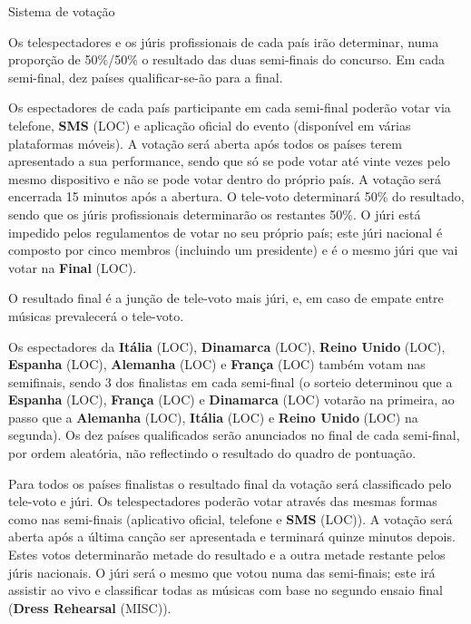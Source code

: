 \documentclass[12pt,a4paper]{article}
\begin{document}
Sistema de votação

Os telespectadores e os júris profissionais de cada país irão determinar, numa proporção de 50\%/50\% o resultado das duas semi-finais do concurso. Em cada semi-final, dez países qualificar-se-ão para a final.

Os espectadores de cada país participante em cada semi-final poderão votar via telefone, \textbf{SMS} (LOC) e aplicação oficial do evento (disponível em várias plataformas móveis). A votação será aberta após todos os países terem apresentado a sua performance, sendo que só se pode votar até vinte vezes pelo mesmo dispositivo e não se pode votar dentro do próprio país. A votação será encerrada 15 minutos após a abertura. O tele-voto determinará 50\% do resultado, sendo que os júris profissionais determinarão os restantes 50\%. O júri está impedido pelos regulamentos de votar no seu próprio país; este júri nacional é composto por cinco membros (incluindo um presidente) e é o mesmo júri que vai votar na \textbf{Final} (LOC).

O resultado final é a junção de tele-voto mais júri, e, em caso de empate entre músicas prevalecerá o tele-voto.

Os espectadores da \textbf{Itália} (LOC), \textbf{Dinamarca} (LOC), \textbf{Reino Unido} (LOC), \textbf{Espanha} (LOC), \textbf{Alemanha} (LOC) e \textbf{França} (LOC) também votam nas semifinais, sendo 3 dos finalistas em cada semi-final (o sorteio determinou que a \textbf{Espanha} (LOC), \textbf{França} (LOC) e \textbf{Dinamarca} (LOC) votarão na primeira, ao passo que a \textbf{Alemanha} (LOC), \textbf{Itália} (LOC) e \textbf{Reino Unido} (LOC) na segunda). Os dez países qualificados serão anunciados no final de cada semi-final, por ordem aleatória, não reflectindo o resultado do quadro de pontuação.

Para todos os países finalistas o resultado final da votação será classificado pelo tele-voto e júri. Os telespectadores poderão votar através das mesmas formas como nas semi-finais (aplicativo oficial, telefone e \textbf{SMS} (LOC)). A votação será aberta após a última canção ser apresentada e terminará quinze minutos depois. Estes votos determinarão metade do resultado e a outra metade restante pelos júris nacionais. O júri será o mesmo que votou numa das semi-finais; este irá assistir ao vivo e classificar todas as músicas com base no segundo ensaio final (\textbf{Dress Rehearsal} (MISC)).
\end{document}
